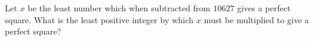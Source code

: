 Let $x$ be the least number which when subtracted from $10627$ gives a perfect square. What is the least positive integer by which $x$ must be multiplied to give a perfect square?
